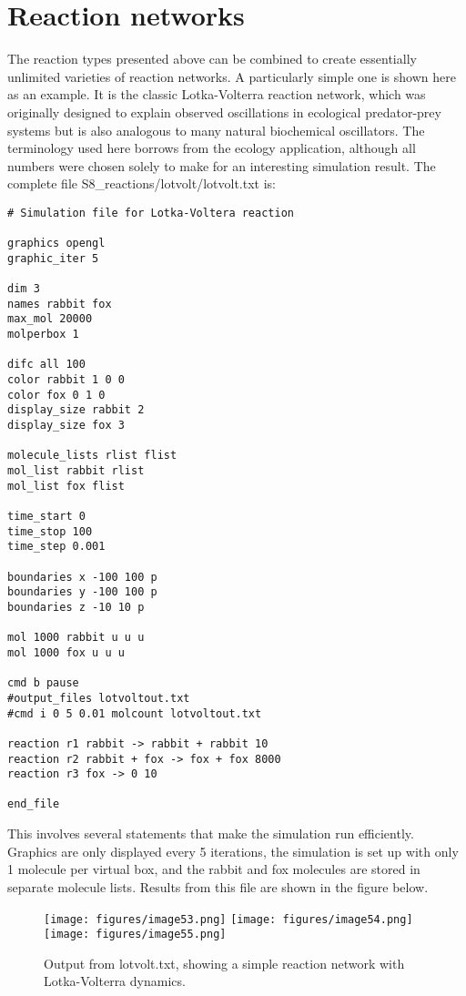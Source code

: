 \documentclass {scrbook}
\begin{document}
\section{Reaction networks}

The reaction types presented above can be combined to create essentially unlimited varieties of reaction networks. A particularly simple one is shown here as an example. It is the classic Lotka-Volterra reaction network, which was originally designed to explain observed oscillations in ecological predator-prey systems but is also analogous to many natural biochemical oscillators. The terminology used here borrows from the ecology application, although all numbers were chosen solely to make for an interesting simulation result. The complete file S8\_reactions/lotvolt/lotvolt.txt is:

\begin{lstlisting}[style=SSAC]
# Simulation file for Lotka-Voltera reaction

graphics opengl
graphic_iter 5

dim 3
names rabbit fox
max_mol 20000
molperbox 1

difc all 100
color rabbit 1 0 0
color fox 0 1 0
display_size rabbit 2
display_size fox 3

molecule_lists rlist flist
mol_list rabbit rlist
mol_list fox flist

time_start 0
time_stop 100
time_step 0.001

boundaries x -100 100 p
boundaries y -100 100 p
boundaries z -10 10 p

mol 1000 rabbit u u u
mol 1000 fox u u u

cmd b pause
#output_files lotvoltout.txt
#cmd i 0 5 0.01 molcount lotvoltout.txt

reaction r1 rabbit -> rabbit + rabbit 10
reaction r2 rabbit + fox -> fox + fox 8000
reaction r3 fox -> 0 10

end_file
\end{lstlisting}

This involves several statements that make the simulation run efficiently. Graphics are only displayed every 5 iterations, the simulation is set up with only 1 molecule per virtual box, and the rabbit and fox molecules are stored in separate molecule lists. Results from this file are shown in the figure below.

\begin{figure}[h]
\centering
\texttt{[image: figures/image53.png]}
\texttt{[image: figures/image54.png]}
\texttt{[image: figures/image55.png]}
\caption{Output from lotvolt.txt, showing a simple reaction network with Lotka-Volterra dynamics.}
\label{fig:lotvolt}
\end{figure}
\end{document}
